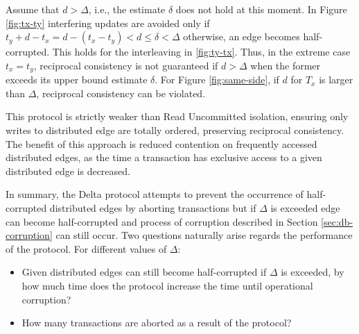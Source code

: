 \documentclass[sigplan,10pt]{acmart}
\newcommand{\tDelta}{\textsf{Delta}\xspace}
\begin{document}
Assume that $d > \Delta$, i.e., the estimate $\delta$ does not hold at this moment. In Figure \ref{fig:tx-ty} interfering updates are avoided only if $t_y + d - t_x = d - (t_x-t_y) < d \leq \delta < \Delta$ otherwise, an edge becomes half-corrupted. This holds for the interleaving in \ref{fig:ty-tx}. Thus, in the extreme case $t_x = t_y$, reciprocal consistency is not guaranteed if $d > \Delta$ when the former exceeds its upper bound estimate $\delta$. For Figure \ref{fig:same-side}, if $d$ for $T_x$ is larger than $\Delta$, reciprocal consistency can be violated.

This protocol is strictly weaker than Read Uncommitted isolation, ensuring only writes to distributed edge are totally ordered, preserving reciprocal consistency. The benefit of this approach is reduced contention on frequently accessed distributed edges, as the time a transaction has exclusive access to a given distributed edge is decreased.

In summary, the \tDelta protocol attempts to prevent the occurrence of half-corrupted distributed edges by aborting transactions but if $\Delta$ is exceeded edge can become half-corrupted and process of corruption described in Section \ref{sec:db-corruption} can still occur. Two questions naturally arise regards the performance of the protocol. For different values of $\Delta$:
\begin{itemize}
\item Given distributed edges can still become half-corrupted if $\Delta$ is exceeded, by how much time does the protocol increase the time until operational corruption?
\item How many transactions are aborted as a result of the protocol?
\end{itemize}




\end{document}
